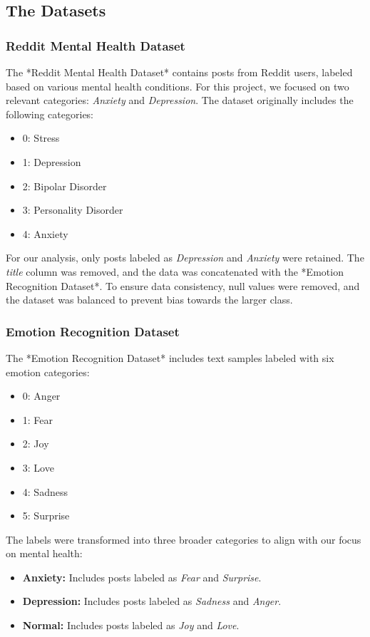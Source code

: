 \documentclass[runningheads,a4paper,11pt]{report}
\begin{document}
\subsection{The Datasets}
\label{section:datasets}

\subsubsection{Reddit Mental Health Dataset}
\label{section:reddit}
The *Reddit Mental Health Dataset* contains posts from Reddit users, labeled based on various mental health conditions. For this project, we focused on two relevant categories: \textit{Anxiety} and \textit{Depression}. The dataset originally includes the following categories:
\begin{itemize}
    \item 0: Stress
    \item 1: Depression
    \item 2: Bipolar Disorder
    \item 3: Personality Disorder
    \item 4: Anxiety
\end{itemize}
For our analysis, only posts labeled as \textit{Depression} and \textit{Anxiety} were retained. The \textit{title} column was removed, and the data was concatenated with the *Emotion Recognition Dataset*. To ensure data consistency, null values were removed, and the dataset was balanced to prevent bias towards the larger class.

\subsubsection{Emotion Recognition Dataset}
\label{section:emotion}
The *Emotion Recognition Dataset* includes text samples labeled with six emotion categories:
\begin{itemize}
    \item 0: Anger
    \item 1: Fear
    \item 2: Joy
    \item 3: Love
    \item 4: Sadness
    \item 5: Surprise
\end{itemize}
The labels were transformed into three broader categories to align with our focus on mental health:
\begin{itemize}
    \item \textbf{Anxiety:} Includes posts labeled as \textit{Fear} and \textit{Surprise}.
    \item \textbf{Depression:} Includes posts labeled as \textit{Sadness} and \textit{Anger}.
    \item \textbf{Normal:} Includes posts labeled as \textit{Joy} and \textit{Love}.
\end{itemize}
\end{document}
